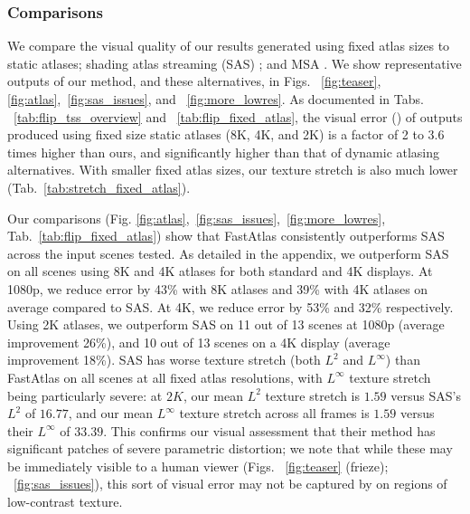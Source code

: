\subsubsection{Comparisons} 
We compare the visual quality of our results generated using fixed atlas sizes to static atlases; shading atlas streaming (SAS) \cite{mueller2018shading}; and MSA \cite{Neff2022MSA}. We show representative outputs of our method, and these alternatives, in Figs. ~\ref{fig:teaser}, \ref{fig:atlas},~\ref{fig:sas_issues}, and ~\ref{fig:more_lowres}.  As documented in Tabs. ~\ref{tab:flip_tss_overview} and ~\ref{tab:flip_fixed_atlas}, the visual error (\FLIP) of outputs produced using fixed size static atlases (8K, 4K, and 2K) is a factor of 2 to 3.6 times higher than ours, and significantly higher than that of dynamic atlasing alternatives. With smaller fixed atlas sizes, our texture stretch is also much lower (Tab.~\ref{tab:stretch_fixed_atlas}).

Our comparisons (Fig. \ref{fig:atlas},~\ref{fig:sas_issues},~\ref{fig:more_lowres}, Tab.~\ref{tab:flip_fixed_atlas}) show that FastAtlas consistently outperforms SAS across the input scenes tested. As detailed in the appendix, we outperform SAS on all scenes using 8K and 4K atlases for both standard and 4K displays. At 1080p, we reduce \FLIP error by 43\% with 8K atlases and 39\% with 4K atlases on average compared to SAS. At 4K, we reduce \FLIP error by 53\% and 32\% respectively. Using 2K atlases, we outperform SAS on 11 out of 13 scenes at 1080p (average improvement 26\%), and 10 out of 13 scenes on a 4K display (average improvement 18\%). SAS has worse texture stretch (both $L^2$ and $L^\infty$) than FastAtlas on all scenes at all fixed atlas resolutions, with $L^\infty$ texture stretch being particularly severe: at $2K$, our mean $L^2$ texture stretch is $1.59$ versus SAS's $L^2$ of $16.77$, and our mean $L^\infty$ texture stretch across all frames is $1.59$ versus their $L^\infty$ of $33.39$. This confirms our visual assessment that their method has significant patches of severe parametric distortion; we note that while these may be immediately visible to a human viewer (Figs. ~\ref{fig:teaser} (frieze); ~\ref{fig:sas_issues}), this sort of visual error may not be captured by \FLIP on regions of low-contrast texture.

